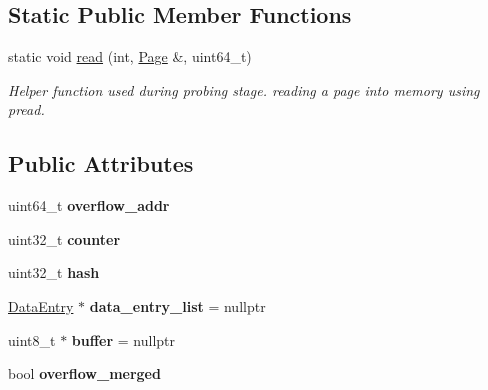 \subsection*{Static Public Member Functions}
\begin{DoxyCompactItemize}
\item 
\hypertarget{class_page_abcbc613bc9b2cc7ca90b8ef89b2e996f}{}static void \hyperlink{class_page_abcbc613bc9b2cc7ca90b8ef89b2e996f}{read} (int, \hyperlink{class_page}{Page} \&, uint64\+\_\+t)\label{class_page_abcbc613bc9b2cc7ca90b8ef89b2e996f}

\begin{DoxyCompactList}\small\item\em Helper function used during probing stage. reading a page into memory using pread. \end{DoxyCompactList}\end{DoxyCompactItemize}
\subsection*{Public Attributes}
\begin{DoxyCompactItemize}
\item 
\hypertarget{class_page_af4274422131fc6e432650f47a3b18ca1}{}uint64\+\_\+t {\bfseries overflow\+\_\+addr}\label{class_page_af4274422131fc6e432650f47a3b18ca1}

\item 
\hypertarget{class_page_aaf8d2ff8db86b06812f9020a54599d28}{}uint32\+\_\+t {\bfseries counter}\label{class_page_aaf8d2ff8db86b06812f9020a54599d28}

\item 
\hypertarget{class_page_a2c002ece8b3ceb2208e5c47c2325749a}{}uint32\+\_\+t {\bfseries hash}\label{class_page_a2c002ece8b3ceb2208e5c47c2325749a}

\item 
\hypertarget{class_page_a3ca5b29177f41a614d8124c7013b64a5}{}\hyperlink{class_data_entry}{Data\+Entry} $\ast$ {\bfseries data\+\_\+entry\+\_\+list} = nullptr\label{class_page_a3ca5b29177f41a614d8124c7013b64a5}

\item 
\hypertarget{class_page_a6dc030c120ee33bbfadbe9dba191dc93}{}uint8\+\_\+t $\ast$ {\bfseries buffer} = nullptr\label{class_page_a6dc030c120ee33bbfadbe9dba191dc93}

\item 
\hypertarget{class_page_adbd1fbdf77dbc3a6f691cee74b17166a}{}bool {\bfseries overflow\+\_\+merged}\label{class_page_adbd1fbdf77dbc3a6f691cee74b17166a}

\end{DoxyCompactItemize}
